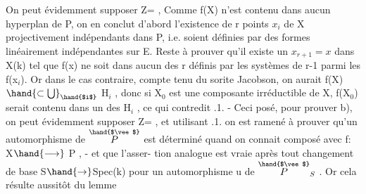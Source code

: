 On peut évidemment supposer Z=\hand{$\emptyset$} ,   Comme  f(X) n'est contenu dans
aucun hyperplan de P, on en conclut d'abord l'existence de r points
$x_i$ de X  projectivement indépendants dans P, i.e. soient définies
par des formes linéairement indépendantes sur E.   Reste à prouver qu'il
existe un  $x_{r+1} = x$   dans X(k) tel que  f(x) ne soit dans aucun des r
  définis par les  systèmes de r-1 parmi les f(x$_i$). Or dans
le cas contraire, compte tenu du sorite Jacobson,  on aurait
f(X) $\hand{\subset\bigcup}_{\hand{$i$}}$ H$_i$ , donc  si X$_0$  est une composante
irréductible de X, f(X$_0$) serait contenu dans un des H$_i$ , ce qui contredit
.1. - Ceci posé,  pour prouver b), on peut  évidemment supposer Z=\hand{$\emptyset$} ,
et utilisant .1.  on est ramené à prouver qu'un automorphisme de $\overset{\hand{$\vee$}}{P}$ est
déterminé quand on connait  composé avec f: X$\hand{\longrightarrow}$ P , - et que l'asser-%
tion analogue est vraie après tout changement de base S$\hand{\rightarrow}$Spec(k)
pour un  automorphisme u de $\overset{\hand{$\vee$}}{P}_S$  .  Or cela résulte aussitôt  du lemme

